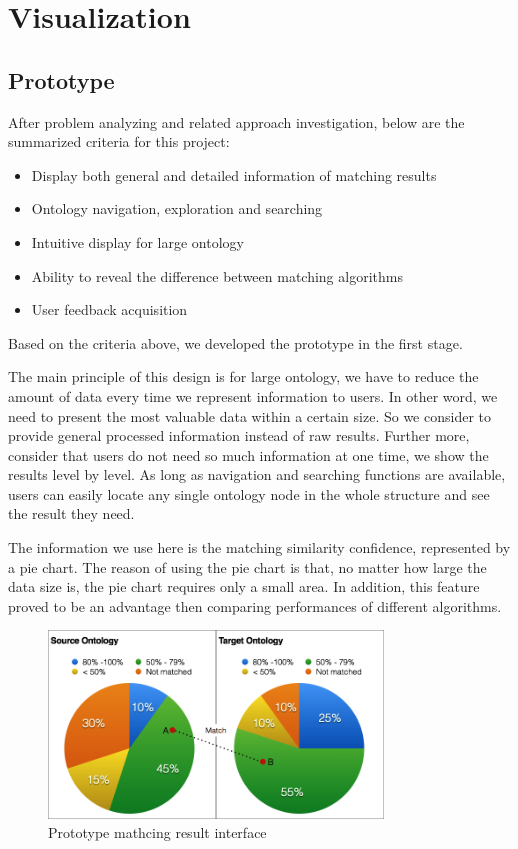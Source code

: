 \chapter{Visualization}

\section{Prototype} %
\label{sub:prototype}
After problem analyzing and related approach investigation, below are the summarized criteria for this project:
\begin{itemize}
	\item Display both general and detailed information of matching results
	\item Ontology navigation, exploration and searching
	\item Intuitive display for large ontology
	\item Ability to reveal the difference between matching algorithms
	\item User feedback acquisition
\end{itemize}

Based on the criteria above, we developed the prototype in the first stage. 

The main principle of this design is for large ontology, we have to reduce the amount of data every time we represent information to users. In other word, we need to present the most valuable data within a certain size. So we consider to provide general processed information instead of raw results. Further more, consider that users do not need so much information at one time, we show the results level by level. As long as navigation and searching functions are available, users can easily locate any single ontology node in the whole structure and see the result they need.

The information we use here is the matching similarity confidence, represented by a pie chart. The reason of using the pie chart is that, no matter how large the data size is, the pie chart requires only a small area. In addition, this feature proved to be an advantage then comparing performances of different algorithms.

\begin{figure}[htb]
	\centering
	\includegraphics[width=3.5in]{pics/proto_pie.png}
	\caption{Prototype mathcing result interface}
	\label{fig:proto_pie}
\end{figure}
	
